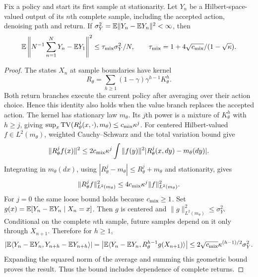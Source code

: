 \begin{lem}
Fix a policy and start its first sample at stationarity. Let $Y_n$ be a
Hilbert-space-valued output of its $n$th complete sample, including the
accepted action, denoising path and return. If
$\sigma_Y^2=\mathbb{E}\|Y_n-\mathbb{E} Y_n\|^2<\infty$, then
\[
 \mathbb{E}\left\|N^{-1}\sum_{n=1}^N Y_n-\mathbb{E} Y_1\right\|^2
 \leq\tau_{\rm mix}\sigma_Y^2/N,\qquad
 \tau_{\rm mix}=1+4\sqrt{c_{\rm mix}}/(1-\sqrt\kappa).
\]
\end{lem}
\begin{proof}
The states $X_n$ at sample boundaries have kernel
\[
 R_\theta=\sum_{h\geq1}(1-\gamma)\gamma^{h-1}K_\theta^h.
\]
Both return branches execute the current policy after averaging over their
action choice. Hence this identity also holds when the value branch
replaces the accepted action. The kernel has stationary law $m_\theta$.
Its $j$th power is a mixture of $K_\theta^h$ with $h\geq j$, giving
$\sup_x\operatorname{TV}(R_\theta^j(x,\cdot),m_\theta)
\leq c_{\rm mix}\kappa^j$.
For centered Hilbert-valued $f\in L^2(m_\theta)$, weighted Cauchy--Schwarz
and the total variation bound give
\[
 \|R_\theta^jf(x)\|^2\leq2c_{\rm mix}\kappa^j
 \int\|f(y)\|^2|R_\theta^j(x,dy)-m_\theta(dy)|.
\]
Integrating in $m_\theta(dx)$, using
$|R_\theta^j-m_\theta|\leq R_\theta^j+m_\theta$ and stationarity, gives
\[
 \|R_\theta^jf\|_{L^2(m_\theta)}^2
 \leq4c_{\rm mix}\kappa^j\|f\|_{L^2(m_\theta)}^2.
\]
For $j=0$ the same loose bound holds because $c_{\rm mix}\geq1$.
Set $g(x)=\mathbb{E}[Y_n-\mathbb{E} Y_n\mid X_n=x]$. Then $g$ is centered and
$\|g\|_{L^2(m_\theta)}^2\leq\sigma_Y^2$.
Conditional on the complete $n$th sample, future samples depend on it only
through $X_{n+1}$. Therefore for $h\geq1$,
\[
 \left|\mathbb{E}\langle Y_n-\mathbb{E} Y_n,Y_{n+h}-\mathbb{E} Y_{n+h}\rangle\right|
 =\left|\mathbb{E}\langle Y_n-\mathbb{E} Y_n,R_\theta^{h-1}g(X_{n+1})\rangle\right|
 \leq2\sqrt{c_{\rm mix}}\kappa^{(h-1)/2}\sigma_Y^2.
\]
Expanding the squared norm of the average and summing this geometric bound
proves the result. Thus the bound includes dependence of complete returns.
\end{proof}

